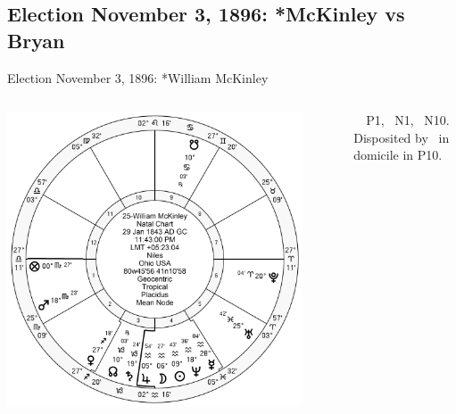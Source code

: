 \subsection{Election November 3, 1896: *McKinley vs Bryan}
\begin{frame}[t]{Election November 3, 1896: *William McKinley}
\small
\begin{columns}[T, onlytextwidth]
\vspace{-1em}
{\includegraphics[width=0.9\textwidth]{charts/McKinley.png}}
\fontsize{8pt}{9pt}\selectfont

\Jupiter\, \Sextile\, P1, \Square\, N1, \Opposition\, N10. Disposited by \Saturn\, in domicile in P10.


\end{columns}
\end{frame}
